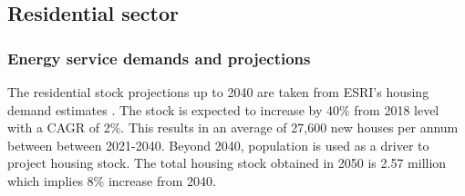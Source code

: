 \documentclass[gmd,manuscript]{copernicus}
\begin{document}
\clearpage

\subsection{Residential sector}
\label{ss:residential}
\subsubsection{Energy service demands and projections}


The residential stock projections up to 2040 are taken from ESRI's housing demand estimates \citep{Bergin2020}. The stock is expected to increase by 40\% from 2018 level with a CAGR of 2\%. This results in an average of 27,600 new houses per annum between between 2021-2040. Beyond 2040, population is used as a driver to project housing stock. The total housing stock obtained in 2050 is 2.57 million which implies 8\% increase from 2040. 
\end{document}
